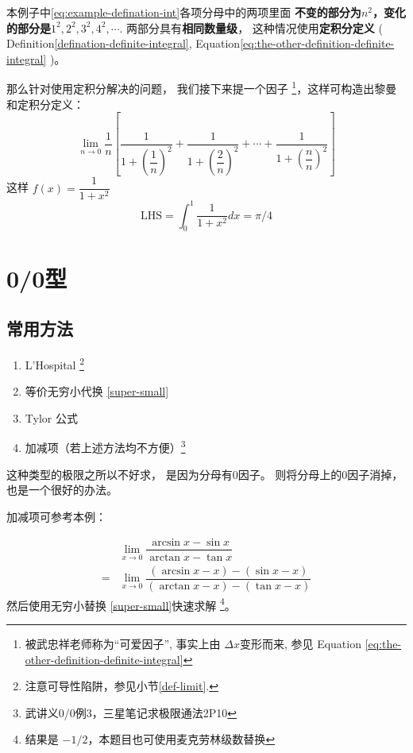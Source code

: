 本例子中\ref{eq:example-defination-int}各项分母中的两项里面
\textbf{不变的部分为$n^2$，变化的部分是$1^2,2^2,3^2,4^2,\cdots$}.
两部分具有\textbf{相同数量级}，
这种情况使用\textbf{定积分定义}
(
    Definition\ref{defination-definite-integral}, 
    Equation\ref{eq:the-other-definition-definite-integral}
)。

那么针对使用定积分解决的问题，
我们接下来提一个因子
\footnote{
    被武忠祥老师称为“可爱因子”, 事实上由 
    $\Delta x$变形而来, 
    参见 Equation \ref{eq:the-other-definition-definite-integral}
}，这样可构造出黎曼和定积分定义：
\begin{equation*}
	\lim_{n \to 0} \dfrac{1}{n} \left[ 
	\dfrac{1}{1+\left(\dfrac{1}{n}\right)^2} + 
	\dfrac{1}{1+\left(\dfrac{2}{n}\right)^2} + \cdots + 
	\dfrac{1}{1+\left(\dfrac{n}{n}\right)^2}
	\right]  
\end{equation*}
这样 $f(x) = \dfrac{1}{1+x^2}$
\begin{equation*}
	\mbox{LHS} = \int_{0}^{1} \dfrac{1}{1+x^2} dx = \pi / 4
\end{equation*}

\section{0/0型}
\label{0-slash-0-type-limits}
\subsection{常用方法}
\begin{enumerate}
    \item L'Hospital \footnote{注意可导性陷阱，参见小节\ref{def-limit}.}
	\item 等价无穷小代换 \ref{super-small}
	\item Tylor 公式
	\item 加减项（若上述方法均不方便）\footnote{武讲义0/0例3，三星笔记求极限通法2P10}
\end{enumerate}

这种类型的极限之所以不好求，
是因为分母有0因子。
则将分母上的0因子消掉，也是一个很好的办法。

加减项可参考本例：
\begin{example}
    \begin{align*}
        &\lim_{x \to 0} \dfrac{\arcsin{x} - \sin{x}}{\arctan{x} - \tan{x}} \\
        = &\lim_{x \to 0} \dfrac{(\arcsin{x} -x) - (\sin{x}-x)}{(\arctan{x}-x) - (\tan{x}-x)}
    \end{align*}
    然后使用无穷小替换
    \ref{super-small}快速求解
    \footnote{结果是 $-1/2$，本题目也可使用麦克劳林级数替换}。
\end{example}

